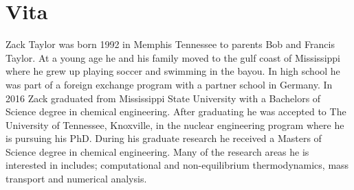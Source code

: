 \chapter*{Vita} \label{ch:vita}
Zack Taylor was born 1992 in Memphis Tennessee to parents Bob and Francis Taylor. At a young age he and his family moved to the gulf coast of Mississippi where he grew up playing soccer and swimming in the bayou. In high school he was part of a foreign exchange program with a partner school in Germany. In 2016 Zack graduated from Mississippi State University with a Bachelors of Science degree in chemical engineering. After graduating he was accepted to The University of Tennessee, Knoxville, in the nuclear engineering program where he is pursuing his PhD. During his graduate research he received a Masters of Science degree in chemical engineering. Many of the research areas he is interested in includes; computational and non-equilibrium thermodynamics, mass transport and numerical analysis. 